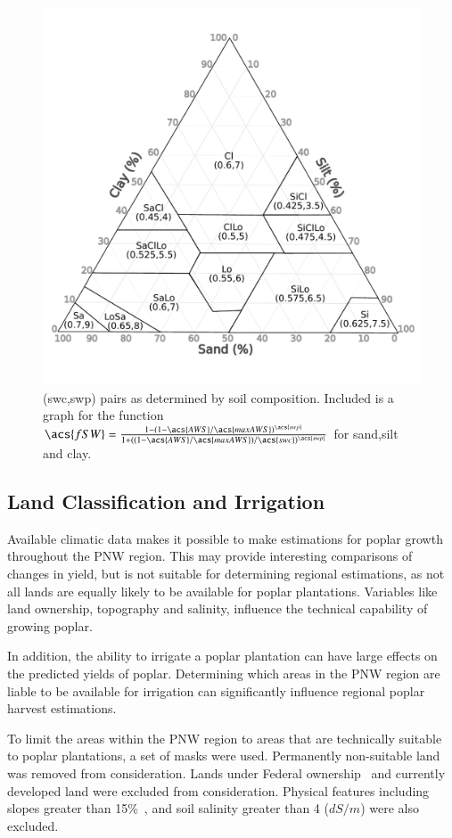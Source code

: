 \documentclass[preprint,review,12pt]{elsarticle}
\begin{document}
\begin{figure}
  \centering
  \includegraphics[width=0.52\linewidth]{soil_triangle}
  
  \caption{(\acs{swc},\acs{swp}) pairs as determined by soil
    composition.  Included is a graph for the function $\acs{fSW} =
    \frac{1-(1-\acs{AWS}/\acs{maxAWS})^{\acs{swp}}}{1+((1-\acs{AWS}/\acs{maxAWS})/\acs{swc})^{\acs{swp}}}$
    for sand,silt and clay. }
  \label{fig:soil-triangle}
\end{figure}

\subsection{Land Classification and Irrigation}
\label{sec:land}

Available climatic data makes it possible to make estimations for
poplar growth throughout the \ac{PNW} region.  This may provide
interesting comparisons of changes in yield, but is not suitable
for determining regional estimations, as not all lands are equally likely
to be available for poplar plantations.  Variables like land
ownership, topography and salinity, influence the technical capability
of growing poplar.  

In addition, the ability to irrigate a poplar plantation can have
large effects on the predicted yields of poplar.  Determining which
areas in the \ac{PNW} region are liable to be available for irrigation
can significantly influence regional poplar harvest estimations.  

To limit the areas within the \ac{PNW} region to areas that are
technically suitable to poplar plantations, a set of masks were used.
Permanently non-suitable land was removed from consideration. Lands
under Federal ownership~\cite{NationalAtlasoftheUnitedStates2013} and
currently developed land were excluded from consideration.  Physical
features including slopes greater than 15\%~\cite{Gesch2007}, and soil
salinity greater than 4 ($dS/m$) were also
excluded.
\end{document}
